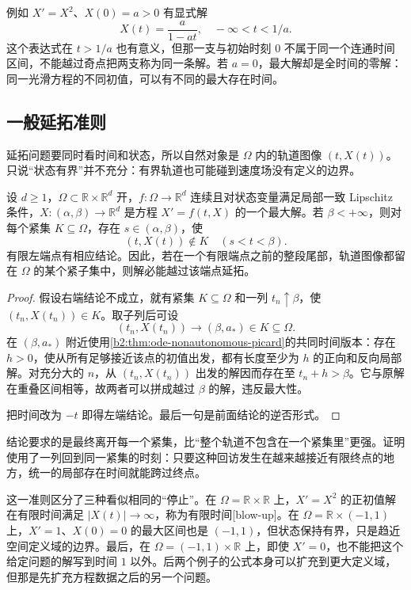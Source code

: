 例如 \(X'=X^2\)、\(X(0)=a>0\) 有显式解
\[
 X(t)=\frac{a}{1-at},\quad -\infty<t<1/a.
\]
这个表达式在 \(t>1/a\) 也有意义，但那一支与初始时刻 \(0\) 不属于同一个连通时间区间，不能越过奇点把两支称为同一条解。若 \(a=0\)，最大解却是全时间的零解：同一光滑方程的不同初值，可以有不同的最大存在时间。

\subsection{一般延拓准则}
\label{b2:subsec:ode-general-continuation}

延拓问题要同时看时间和状态，所以自然对象是 \(\Omega\) 内的轨道图像 \((t,X(t))\)。只说“状态有界”并不充分：有界轨道也可能碰到速度场没有定义的边界。

\begin{theorem}[最大解的延拓准则]\label{b2:thm:ode-continuation}
设 \(d\geq1\)，\(\Omega\subset\mathbb R\times\mathbb R^d\) 开，\(f\colon\Omega\to\mathbb R^d\) 连续且对状态变量满足局部一致 Lipschitz 条件，\(X\colon(\alpha,\beta)\to\mathbb R^d\) 是方程 \(X'=f(t,X)\) 的一个最大解。若 \(\beta<+\infty\)，则对每个紧集 \(K\subseteq\Omega\)，存在 \(s\in(\alpha,\beta)\)，使
\[
 (t,X(t))\notin K\quad(s<t<\beta).
\]
有限左端点有相应结论。因此，若在一个有限端点之前的整段尾部，轨道图像都留在 \(\Omega\) 的某个紧子集中，则解必能越过该端点延拓。
\end{theorem}
\begin{proof}
假设右端结论不成立，就有紧集 \(K\subseteq\Omega\) 和一列 \(t_n\uparrow\beta\)，使 \((t_n,X(t_n))\in K\)。取子列后可设
\[
 (t_n,X(t_n))\longrightarrow(\beta,a_*)\in K\subseteq\Omega.
\]
在 \((\beta,a_*)\) 附近使用\cref{b2:thm:ode-nonautonomous-picard}的共同时间版本：存在 \(h>0\)，使从所有足够接近该点的初值出发，都有长度至少为 \(h\) 的正向和反向局部解。对充分大的 \(n\)，从 \((t_n,X(t_n))\) 出发的解因而存在至 \(t_n+h>\beta\)。它与原解在重叠区间相等，故两者可以拼成越过 \(\beta\) 的解，违反最大性。

把时间改为 \(-t\) 即得左端结论。最后一句是前面结论的逆否形式。
\end{proof}

结论要求的是最终离开每一个紧集，比“整个轨道不包含在一个紧集里”更强。证明使用了一列回到同一紧集的时刻：只要这种回访发生在越来越接近有限终点的地方，统一的局部存在时间就能跨过终点。

\ProseParagraphBreak
这一准则区分了三种看似相同的“停止”。在 \(\Omega=\mathbb R\times\mathbb R\) 上，\(X'=X^2\) 的正初值解在有限时间满足 \(|X(t)|\to\infty\)，称为有限时间[blow-up]。在 \(\Omega=\mathbb R\times(-1,1)\) 上，\(X'=1\)、\(X(0)=0\) 的最大区间也是 \((-1,1)\)，但状态保持有界，只是趋近空间定义域的边界。最后，在 \(\Omega=(-1,1)\times\mathbb R\) 上，即使 \(X'=0\)，也不能把这个给定问题的解写到时间 \(1\) 以外。后两个例子的公式本身可以扩充到更大定义域，但那是先扩充方程数据之后的另一个问题。

